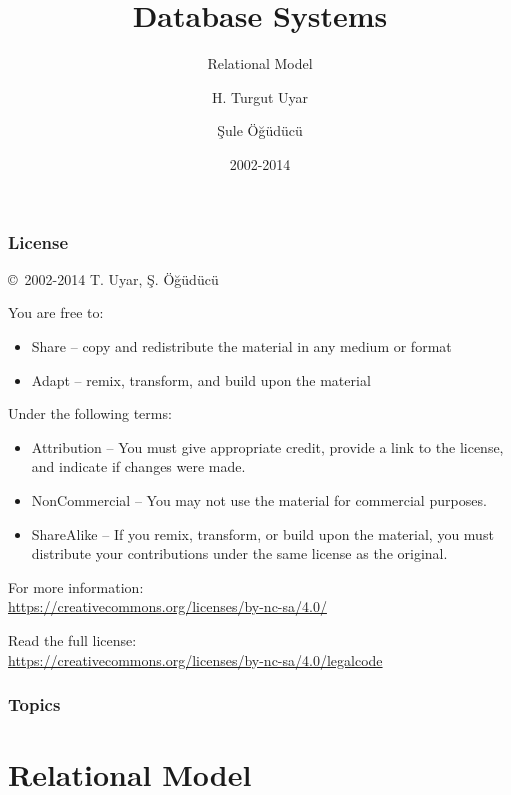 \documentclass[dvipsnames]{beamer}
\title{Database Systems}
\subtitle{Relational Model}
\author{H. Turgut Uyar \and Şule Öğüdücü}
\date{2002-2014}
\theoremstyle{plain}
\begin{document}
\begin{frame}
  \titlepage
\end{frame}

\begin{frame}
  \frametitle{License}

  \hfill
  \copyright~2002-2014 T. Uyar, Ş. Öğüdücü

  \vfill
  \begin{footnotesize}
    You are free to:
    \begin{itemize}
      \itemsep0em
      \item Share -- copy and redistribute the material in any medium or format
      \item Adapt -- remix, transform, and build upon the material
    \end{itemize}

    Under the following terms:
    \begin{itemize}
      \itemsep0em
      \item Attribution -- You must give appropriate credit, provide a link to
        the license, and indicate if changes were made.

      \item NonCommercial -- You may not use the material for commercial
        purposes.

      \item ShareAlike -- If you remix, transform, or build upon the material,
        you must distribute your contributions under the same license as the
        original.
    \end{itemize}
  \end{footnotesize}

  \begin{small}
    For more information:\\
    \url{https://creativecommons.org/licenses/by-nc-sa/4.0/}

    \smallskip
    Read the full license:\\
    \url{https://creativecommons.org/licenses/by-nc-sa/4.0/legalcode}
  \end{small}
\end{frame}

\begin{frame}
  \frametitle{Topics}
  \tableofcontents
\end{frame}

\lstset{language=TutorialD}

\section{Relational Model}
\end{document}
